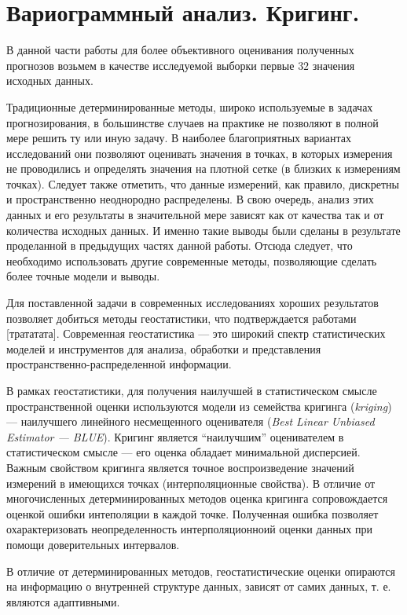 
\section{Вариограммный анализ. Кригинг.} %
\label{sec:_variogram}

В данной части работы для более объективного оценивания полученных прогнозов возьмем в качестве исследуемой выборки первые $32$ значения исходных данных.

Традиционные детерминированные методы, широко используемые в задачах прогнозирования, в большинстве случаев на практике не позволяют в полной мере решить ту или иную задачу. В наиболее благоприятных вариантах исследований они позволяют оценивать значения в точках, в которых измерения не проводились и определять значения на плотной сетке (в близких к измерениям точках). Следует также отметить, что данные измерений, как правило, дискретны и пространственно неоднородно распределены. В свою очередь, анализ этих данных и его результаты в значительной мере зависят как от качества так и от количества исходных данных. И именно такие выводы были сделаны в результате проделанной в предыдущих частях данной работы. Отсюда следует, что необходимо использовать другие современные методы, позволяющие сделать более точные модели и выводы.

Для поставленной задачи в современных исследованиях хороших результатов позволяет добиться методы геостатистики, что подтверждается работами [трататата]. Современная геостатистика --- это широкий спектр статистических моделей и инструментов для анализа, обработки и представления пространственно-распределенной информации.


В рамках геостатистики, для получения наилучшей в статистическом смысле пространственной оценки используются модели из семейства кригинга (\textit{kriging}) --- наилучшего линейного несмещенного оценивателя (\textit{Best Linear Unbiased Estimator --- BLUE}). Кригинг является ``наилучшим'' оценивателем в статистическом смысле --- его оценка обладает минимальной дисперсией. Важным свойством кригинга является точное воспроизведение значений измерений в имеющихся точках (интерполяционные свойства). В отличие от многочисленных детерминированных методов оценка кригинга сопровождается оценкой ошибки интеполяции в каждой точке. Полученная ошибка позволяет охарактеризовать неопределенность интерполяционноий оценки данных при помощи доверительных интервалов.

В отличие от детерминированных методов, геостатистические оценки опираются на информацию о внутренней структуре данных, зависят от самих данных, т. е. являются адаптивными.

